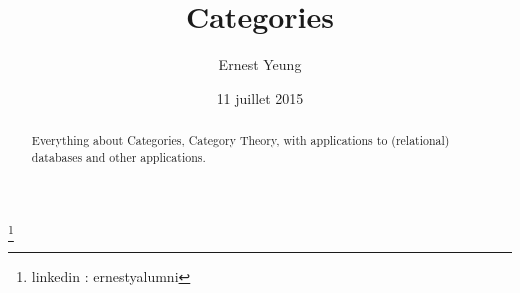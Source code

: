 \documentclass[twoside,landscape,10pt]{amsart}
\theoremstyle{plain}
\theoremstyle{definition}
\theoremstyle{remark}
\begin{document}
\title[Categories]{Categories}
\author{Ernest Yeung}
\address{}
\thanks{linkedin : ernestyalumni }


\date{11 juillet 2015}
\begin{abstract}
Everything about Categories, Category Theory, with applications to (relational) databases and other applications.
\end{abstract}

\maketitle



\tableofcontents
\end{document}
